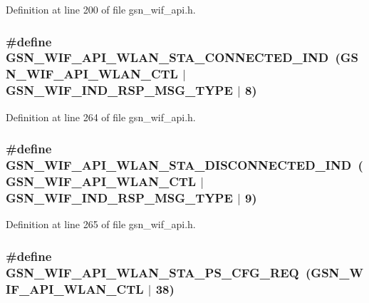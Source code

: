 Definition at line 200 of file gsn\_\-wif\_\-api.h.

\hypertarget{a00606_a80cd149f4f96b359f53dbdfd943431c9}{
\subsubsection[{GSN\_\-WIF\_\-API\_\-WLAN\_\-STA\_\-CONNECTED\_\-IND}]{\setlength{\rightskip}{0pt plus 5cm}\#define GSN\_\-WIF\_\-API\_\-WLAN\_\-STA\_\-CONNECTED\_\-IND~(GSN\_\-WIF\_\-API\_\-WLAN\_\-CTL $|$ GSN\_\-WIF\_\-IND\_\-RSP\_\-MSG\_\-TYPE $|$ 8)}}
\label{a00606_a80cd149f4f96b359f53dbdfd943431c9}


Definition at line 264 of file gsn\_\-wif\_\-api.h.

\hypertarget{a00606_aa2a74f308fee600db82ab1ae2079975b}{
\subsubsection[{GSN\_\-WIF\_\-API\_\-WLAN\_\-STA\_\-DISCONNECTED\_\-IND}]{\setlength{\rightskip}{0pt plus 5cm}\#define GSN\_\-WIF\_\-API\_\-WLAN\_\-STA\_\-DISCONNECTED\_\-IND~(GSN\_\-WIF\_\-API\_\-WLAN\_\-CTL $|$ GSN\_\-WIF\_\-IND\_\-RSP\_\-MSG\_\-TYPE $|$ 9)}}
\label{a00606_aa2a74f308fee600db82ab1ae2079975b}


Definition at line 265 of file gsn\_\-wif\_\-api.h.

\hypertarget{a00606_a123c74a5314e0994fe78bd39d6ce8e62}{
\subsubsection[{GSN\_\-WIF\_\-API\_\-WLAN\_\-STA\_\-PS\_\-CFG\_\-REQ}]{\setlength{\rightskip}{0pt plus 5cm}\#define GSN\_\-WIF\_\-API\_\-WLAN\_\-STA\_\-PS\_\-CFG\_\-REQ~(GSN\_\-WIF\_\-API\_\-WLAN\_\-CTL $|$ 38)}}
\label{a00606_a123c74a5314e0994fe78bd39d6ce8e62}


